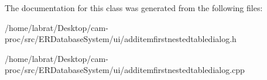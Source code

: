 The documentation for this class was generated from the following files\+:\begin{DoxyCompactItemize}
\item 
/home/labrat/\+Desktop/cam-\/proc/src/\+E\+R\+Database\+System/ui/additemfirstnestedtabledialog.\+h\item 
/home/labrat/\+Desktop/cam-\/proc/src/\+E\+R\+Database\+System/ui/additemfirstnestedtabledialog.\+cpp\end{DoxyCompactItemize}
